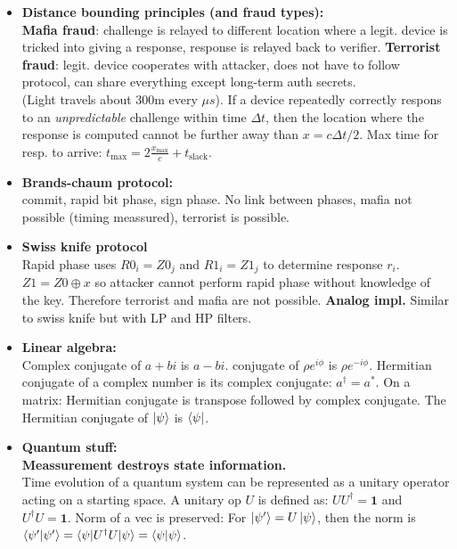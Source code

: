\documentclass[twocolumn,9pt]{extarticle}
\begin{document}
\begin{itemize}

	\item \textbf{Distance bounding principles (and fraud types): } \\
	\textbf{Mafia fraud}: challenge is relayed to different location where a legit. device is tricked into giving a response, response is relayed back to verifier.
	\textbf{Terrorist fraud}: legit. device cooperates with attacker, does not have to follow protocol, can share everything except long-term auth secrets.\\
	(Light travels about 300m every $\mu s$). If a device repeatedly correctly respons to an \emph{unpredictable} challenge within time $\Delta t$, then the location where the response is computed cannot be further away than $x = c \Delta t/2$. Max time for resp. to arrive: $t_{\text{max}} = 2 \frac{x_{\text{max}}}{c} + t_{\text{slack}}$. 

	\item \textbf{Brands-chaum protocol: } \\
	commit, rapid bit phase, sign phase. No link between phases, mafia not possible (timing meassured), terrorist is possible.
	\item \textbf{Swiss knife protocol } \\
	Rapid phase uses $R0_i=Z0_j$ and $R1_i=Z1_j$ to determine response $r_i$. $Z1 = Z0 \oplus x$ so attacker cannot perform rapid phase without knowledge of the key. Therefore terrorist and mafia are not possible. \textbf{Analog impl.} Similar to swiss knife but with LP and HP filters.


	\item \textbf{Linear algebra:} \\
	Complex conjugate of $a+bi$ is $a-bi$. conjugate of $\rho e^{i \phi}$ is $\rho e^{-i \phi}$. Hermitian conjugate of a complex number is its complex conjugate: $a^\dagger = a^*$.
	On a matrix: Hermitian conjugate is transpose followed by complex conjugate.
	The Hermitian conjugate of $\ket{\psi}$ is $\bra{\psi}$.

	\item \textbf{Quantum stuff:} \\
	\textbf{Meassurement destroys state information.}\\
	Time evolution of a quantum system can be represented as a unitary operator acting on a starting space. A unitary op $U$ is defined as: $UU^\dagger = \mathbf{1}$ and $U^\dagger U = \mathbf{1}$. Norm of a vec is preserved: For $\ket{\psi'} = U\ket{\psi}$, then the norm is $\braket{\psi'|\psi'} = \braket{\psi|U^\dagger U|\psi} = \braket{\psi|\psi}$.


\end{itemize}
\end{document}
